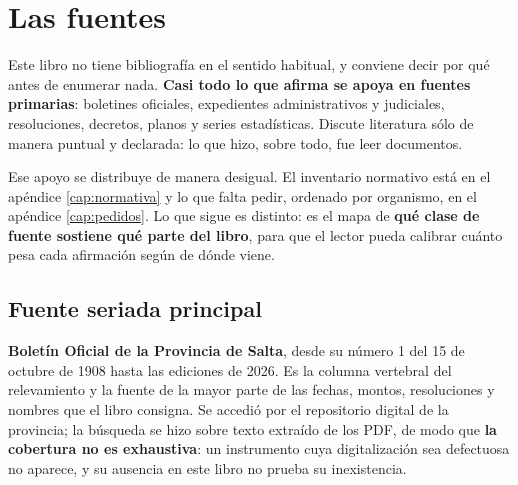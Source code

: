 \chapter{Las fuentes}
\label{cap:fuentes}

Este libro no tiene bibliografía en el sentido habitual, y conviene decir por qué antes de
enumerar nada. \textbf{Casi todo lo que afirma se apoya en fuentes primarias}: boletines
oficiales, expedientes administrativos y judiciales, resoluciones, decretos, planos y series
estadísticas. Discute literatura sólo de manera puntual y declarada: lo que hizo, sobre todo, fue leer documentos.

Ese apoyo se distribuye de manera desigual. El inventario normativo está en el apéndice
\ref{cap:normativa} y lo que falta pedir, ordenado por organismo, en el apéndice
\ref{cap:pedidos}. Lo que sigue es distinto: es el mapa de \textbf{qué clase de fuente
sostiene qué parte del libro}, para que el lector pueda calibrar cuánto pesa cada
afirmación según de dónde viene.

\section{Fuente seriada principal}

\textbf{Boletín Oficial de la Provincia de Salta}, desde su número 1 del 15 de octubre de
1908 hasta las ediciones de 2026. Es la columna vertebral del relevamiento y la fuente de la
mayor parte de las fechas, montos, resoluciones y nombres que el libro consigna. Se accedió
por el repositorio digital de la provincia; la búsqueda se hizo sobre texto extraído de los
PDF, de modo que \textbf{la cobertura no es exhaustiva}: un instrumento cuya digitalización
sea defectuosa no aparece, y su ausencia en este libro no prueba su inexistencia.

